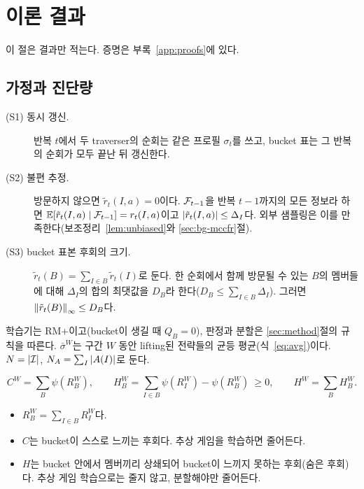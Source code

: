 \section{이론 결과}\label{sec:theory}

이 절은 결과만 적는다. 증명은 부록~\ref{app:proofs}에 있다.

\subsection{가정과 진단량}
\begin{assumption}\label{ass:S}
\begin{description}
  \item[(S1) 동시 갱신.] 반복 $t$에서 두 traverser의 순회는 같은 프로필 $\sigma_t$를 쓰고, bucket 표는 그 반복의 순회가 모두 끝난 뒤 갱신한다.
  \item[(S2) 불편 추정.] 방문하지 않으면 $\tilde r_t(I,a)=0$이다. $\mathcal{F}_{t-1}$을 반복 $t-1$까지의 모든 정보라 하면 $\mathbb{E}[\tilde r_t(I,a)\mid\mathcal{F}_{t-1}]=r_t(I,a)$이고 $\left\lvert \tilde r_t(I,a)\right\rvert\le\Delta_I$다.
    외부 샘플링은 이를 만족한다(보조정리~\ref{lem:unbiased}와 \ref{sec:bg-mccfr}절).
  \item[(S3) bucket 표본 후회의 크기.] $\tilde r_t(B)=\sum_{I\in B}\tilde r_t(I)$로 둔다. 한 순회에서 함께 방문될 수 있는 $B$의 멤버들에 대해 $\Delta_I$의 합의 최댓값을 $D_B$라 한다($D_B\le\sum_{I\in B}\Delta_I$). 그러면 $\left\lVert \tilde r_t(B)\right\rVert_\infty\le D_B$다.
\end{description}
\end{assumption}
\noindent 학습기는 RM+이고(bucket이 생길 때 $Q_B=0$), 판정과 분할은 \ref{sec:method}절의 규칙을 따른다.
$\bar\sigma^W$는 구간 $W$ 동안 lifting된 전략들의 균등 평균(식~\eqref{eq:avg})이다.
$N=\left\lvert \mathcal{I}\right\rvert$, $N_A=\sum_I\left\lvert A(I)\right\rvert$로 둔다.

\begin{definition}
\[
C^W=\sum_B\psi(R_B^W),\qquad H_B^W=\sum_{I\in B}\psi(R_I^W)-\psi(R_B^W)\ \ge0,\qquad H^W=\sum_BH_B^W.
\]
\begin{itemize}
  \item $R_B^W=\sum_{I\in B}R_I^W$다.
  \item $C$는 bucket이 스스로 느끼는 후회다. 추상 게임을 학습하면 줄어든다.
  \item $H$는 bucket 안에서 멤버끼리 상쇄되어 bucket이 느끼지 못하는 후회(숨은 후회)다. 추상 게임 학습으로는 줄지 않고, 분할해야만 줄어든다.
\end{itemize}
\end{definition}


